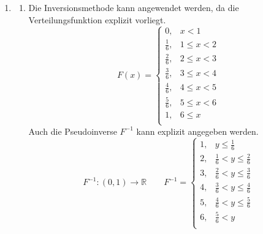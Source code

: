 \documentclass[a4paper]{scrartcl}
\def \blattnr {12}
\begin{document}
\begin{enumerate}[label=\bfseries \blattnr.\arabic*]
    \item %
        \begin{enumerate}
            \item
                Die Inversionsmethode kann angewendet werden, da die
                Verteilungsfunktion explizit vorliegt.
                \begin{equation*}
                    F(x) =
                    \begin{cases}
                        0          , & x < 1        \\
                        \frac{1}{6}, & 1 \leq x < 2 \\
                        \frac{2}{6}, & 2 \leq x < 3 \\
                        \frac{3}{6}, & 3 \leq x < 4 \\
                        \frac{4}{6}, & 4 \leq x < 5 \\
                        \frac{5}{6}, & 5 \leq x < 6 \\
                        1          , & 6 \leq x     \\
                    \end{cases}
                \end{equation*}
                Auch die Pseudoinverse $F^{-1}$ kann explizit angegeben werden.
                \begin{equation*}
                    F^{-1}\colon (0,1) \to \mathbb{R}
                    \qquad
                    F^{-1} =
                    \begin{cases}
                        1,  & y \leq \frac{1}{6}               \\
                        2,  & \frac{1}{6} < y \leq \frac{2}{6} \\
                        3,  & \frac{2}{6} < y \leq \frac{3}{6} \\
                        4,  & \frac{3}{6} < y \leq \frac{4}{6} \\
                        5,  & \frac{4}{6} < y \leq \frac{5}{6} \\
                        6,  & \frac{5}{6} < y                  \\
                    \end{cases}
                \end{equation*}


\end{enumerate}
\end{enumerate}
\end{document}
